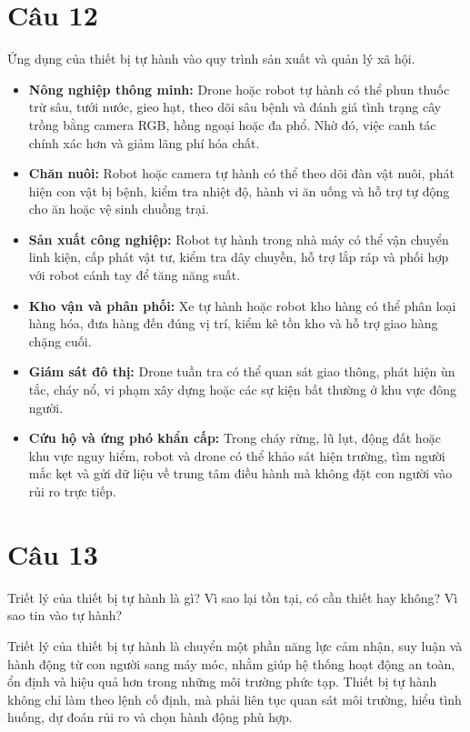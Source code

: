 \section*{Câu 12}
Ứng dụng của thiết bị tự hành vào quy trình sản xuất và quản lý xã hội.

\begin{itemize}
    \item \textbf{Nông nghiệp thông minh:} Drone hoặc robot tự hành có thể phun thuốc trừ sâu, tưới nước, gieo hạt, theo dõi sâu bệnh và đánh giá tình trạng cây trồng bằng camera RGB, hồng ngoại hoặc đa phổ. Nhờ đó, việc canh tác chính xác hơn và giảm lãng phí hóa chất.

    \item \textbf{Chăn nuôi:} Robot hoặc camera tự hành có thể theo dõi đàn vật nuôi, phát hiện con vật bị bệnh, kiểm tra nhiệt độ, hành vi ăn uống và hỗ trợ tự động cho ăn hoặc vệ sinh chuồng trại.

    \item \textbf{Sản xuất công nghiệp:} Robot tự hành trong nhà máy có thể vận chuyển linh kiện, cấp phát vật tư, kiểm tra dây chuyền, hỗ trợ lắp ráp và phối hợp với robot cánh tay để tăng năng suất.

    \item \textbf{Kho vận và phân phối:} Xe tự hành hoặc robot kho hàng có thể phân loại hàng hóa, đưa hàng đến đúng vị trí, kiểm kê tồn kho và hỗ trợ giao hàng chặng cuối.

    \item \textbf{Giám sát đô thị:} Drone tuần tra có thể quan sát giao thông, phát hiện ùn tắc, cháy nổ, vi phạm xây dựng hoặc các sự kiện bất thường ở khu vực đông người.

    \item \textbf{Cứu hộ và ứng phó khẩn cấp:} Trong cháy rừng, lũ lụt, động đất hoặc khu vực nguy hiểm, robot và drone có thể khảo sát hiện trường, tìm người mắc kẹt và gửi dữ liệu về trung tâm điều hành mà không đặt con người vào rủi ro trực tiếp.
\end{itemize}


\section*{Câu 13}
Triết lý của thiết bị tự hành là gì? Vì sao lại tồn tại, có cần thiết hay không? Vì sao tin vào tự hành?

Triết lý của thiết bị tự hành là chuyển một phần năng lực cảm nhận, suy luận và hành động từ con người sang máy móc, nhằm giúp hệ thống hoạt động an toàn, ổn định và hiệu quả hơn trong những môi trường phức tạp. Thiết bị tự hành không chỉ làm theo lệnh cố định, mà phải liên tục quan sát môi trường, hiểu tình huống, dự đoán rủi ro và chọn hành động phù hợp.

